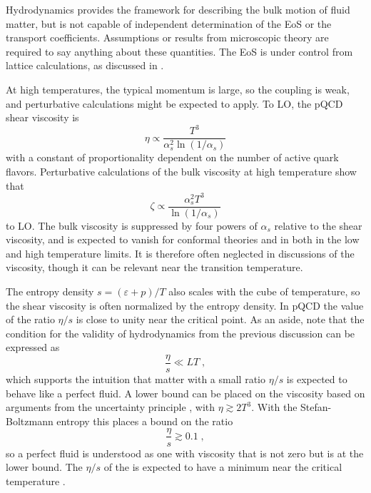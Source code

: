 Hydrodynamics provides the framework for describing the bulk motion of fluid matter, but is not capable of independent determination of the \ac{EoS} or the transport coefficients.
Assumptions or results from microscopic theory are required to say anything about these quantities.
The \qcd \ac{EoS} is under control from lattice calculations, as discussed in . %

At high temperatures, the typical momentum is large, so the coupling is weak, and perturbative calculations might be expected to apply.
To \ac{LO}, the \ac{pQCD} shear viscosity is \cite{Arnold:2000dr}
\begin{equation}
\eta \propto \frac{T^3}{\alpha_s^2 \ln \left( 1/\alpha_s\right) }
\end{equation}
with a constant of proportionality dependent on the number of active quark flavors.
Perturbative calculations of the bulk viscosity at high temperature show that \cite{Arnold:2006fz}
\begin{equation}
\zeta \propto \frac{\alpha_s^2 T^3}{\ln \left(1/\alpha_s\right)}
\end{equation}
to \ac{LO}.
The bulk viscosity is suppressed by four powers of $\alpha_s$ relative to the shear viscosity, and is expected to vanish for conformal theories and in both in the low and high temperature limits.
It is therefore often neglected in discussions of the \qgp viscosity, though it can be relevant near the transition temperature.

The entropy density $s = (\varepsilon + p)/T$ also scales with the cube of temperature, so the shear viscosity is often normalized by the entropy density.
In \ac{pQCD} the value of the ratio $\eta/s$ is close to unity near the critical point.
As an aside, note that the condition for the validity of hydrodynamics from the previous discussion can be expressed as
\begin{equation}
  \frac{\eta}{s} \ll LT \;,
\end{equation}
which supports the intuition that matter with a small ratio $\eta/s$ is expected to behave like a perfect fluid.
A lower bound can be placed on the viscosity based on arguments from the uncertainty principle \cite{Danielewicz:1984ww}, with $\eta \gtrsim 2T^3$.
With the Stefan-Boltzmann entropy this places a bound on the ratio
\begin{equation}
  \label{eq:eta_over_s_uncertainty}
  \frac{\eta}{s} \gtrsim 0.1 \; ,
\end{equation}
so a perfect fluid is understood as one with viscosity that is not zero but is at the lower bound.
The $\eta/s$ of the \qgp is expected to have a minimum near the critical temperature \cite{Csernai:2006zz}.

